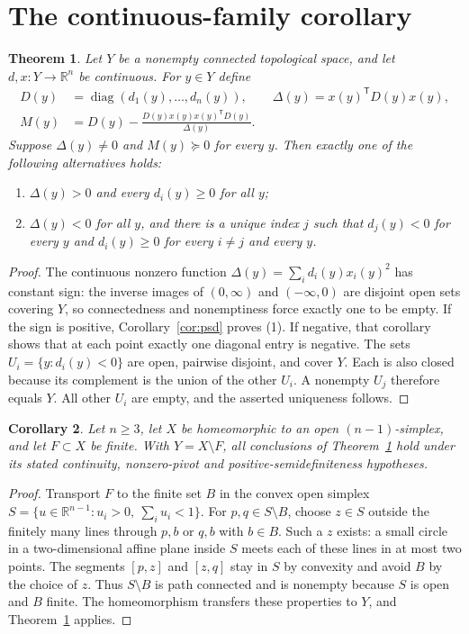 \documentclass[11pt]{article}
\newtheorem{theorem}{Theorem}
\newtheorem{corollary}[theorem]{Corollary}
\newcommand{\R}{\mathbb R}
\newcommand{\diag}{\operatorname{diag}}
\begin{document}
\section{The continuous-family corollary}
\begin{theorem}\label{thm:family}
Let $Y$ be a nonempty connected topological space, and let
$d,x:Y\to\R^n$ be continuous. For $y\in Y$ define
\begin{align*}
D(y)&=\diag(d_1(y),\ldots,d_n(y)),\qquad
\Delta(y)=x(y)^{\mathsf T}D(y)x(y),\\
M(y)&=D(y)-\frac{D(y)x(y)x(y)^{\mathsf T}D(y)}{\Delta(y)}.
\end{align*}
Suppose $\Delta(y)\ne0$ and $M(y)\succeq0$ for every $y$.
Then exactly one of the following alternatives holds:
\begin{enumerate}
\item $\Delta(y)>0$ and every $d_i(y)\ge0$ for all $y$;
\item $\Delta(y)<0$ for all $y$, and there is a unique index $j$ such that
      $d_j(y)<0$ for every $y$ and $d_i(y)\ge0$ for every $i\ne j$ and every $y$.
\end{enumerate}
\end{theorem}
\begin{proof}
The continuous nonzero function
$\Delta(y)=\sum_i d_i(y)x_i(y)^2$ has constant sign:
the inverse images of $(0,\infty)$ and $(-\infty,0)$ are disjoint open
sets covering $Y$, so connectedness and nonemptiness force exactly one
to be empty. If the sign is positive, Corollary~\ref{cor:psd} proves (1).
If negative, that corollary shows that at each point exactly one diagonal
entry is negative. The sets $U_i=\{y:d_i(y)<0\}$ are open, pairwise
disjoint, and cover $Y$. Each is also closed because its complement is
the union of the other $U_i$. A nonempty $U_j$ therefore equals $Y$.
All other $U_i$ are empty, and the asserted uniqueness follows.
\end{proof}

\begin{corollary}\label{cor:simplex}
Let $n\ge3$, let $X$ be homeomorphic to an open $(n-1)$-simplex, and let
$F\subset X$ be finite. With $Y=X\setminus F$, all conclusions of
Theorem~\ref{thm:family} hold under its stated continuity, nonzero-pivot
and positive-semidefiniteness hypotheses.
\end{corollary}
\begin{proof}
Transport $F$ to the finite set $B$ in the convex open simplex
$S=\{u\in\R^{n-1}:u_i>0,\ \sum_i u_i<1\}$.
For $p,q\in S\setminus B$, choose $z\in S$ outside the finitely many
lines through $p,b$ or $q,b$ with $b\in B$.
Such a $z$ exists: a small circle in a two-dimensional affine plane
inside $S$ meets each of these lines in at most two points.
The segments $[p,z]$ and $[z,q]$ stay in $S$ by convexity and avoid $B$
by the choice of $z$. Thus $S\setminus B$ is path connected and is nonempty
because $S$ is open and $B$ finite. The homeomorphism transfers these
properties to $Y$, and Theorem~\ref{thm:family} applies.
\end{proof}
\end{document}
